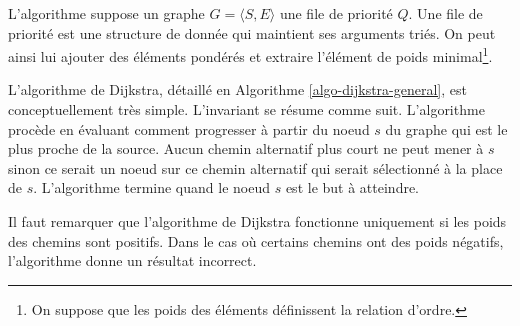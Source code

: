 \documentclass[11pt,openany]{book}
\begin{document}
L'algorithme suppose un graphe $G= \langle S,E \rangle$ une file de priorité $Q$. Une file de priorité
est une structure de donnée qui maintient ses arguments triés. On peut
ainsi lui ajouter des éléments pondérés et extraire l'élément de
poids minimal\footnote{On suppose que les poids des éléments
  définissent la relation d'ordre.}.

L'algorithme de Dijkstra, détaillé en Algorithme
\ref{algo-dijkstra-general}, est conceptuellement très simple. 
L'invariant se résume comme suit.
L'algorithme procède en évaluant comment progresser à partir du noeud
$s$ du graphe qui est le plus proche de la source.
Aucun chemin alternatif plus court ne peut mener à $s$ sinon ce serait
un noeud sur ce chemin alternatif qui serait
sélectionné à la place de $s$. L'algorithme termine quand le noeud $s$
est le but à atteindre.

Il faut remarquer que l'algorithme de Dijkstra fonctionne uniquement
si les poids des chemins sont positifs. Dans le cas où certains
chemins ont des poids négatifs, l'algorithme donne un résultat incorrect.
\end{document}
